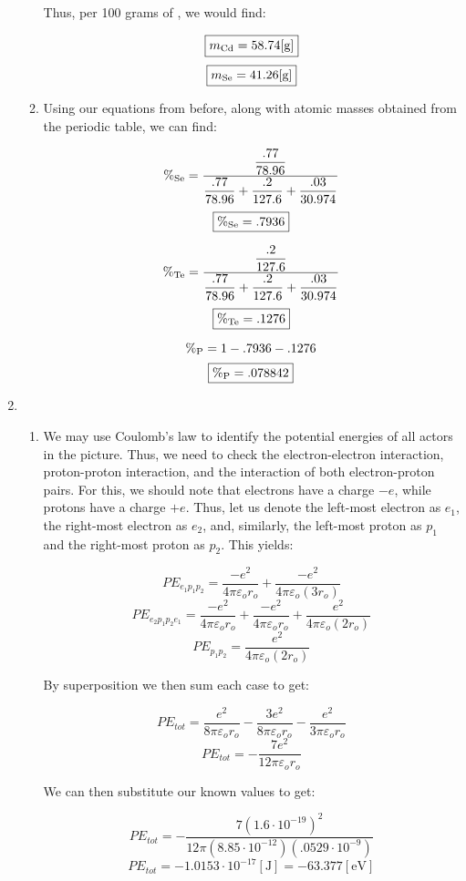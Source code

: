 \begin{enumerate}
\begin{enumerate}
        Thus, per 100 grams of , we would find:

        $$\boxed{m_{\ce{Cd}}=58.74[\si{\gram}]}$$
        $$\boxed{m_{\ce{Se}}=41.26[\si{\gram}]}$$

      \item Using our equations from before, along with atomic masses obtained from the periodic table, we can find:

        $$\%_{\ce{Se}}=\frac{\dfrac{.77}{78.96}}{\dfrac{.77}{78.96}+\dfrac{.2}{127.6}+\dfrac{.03}{30.974}}$$
        $$\boxed{\%_{\ce{Se}}=.7936}$$

        $$\%_{\ce{Te}}=\frac{\dfrac{.2}{127.6}}{\dfrac{.77}{78.96}+\dfrac{.2}{127.6}+\dfrac{.03}{30.974}}$$
        $$\boxed{\%_{\ce{Te}}=.1276}$$

        $$\%_{\ce{P}}=1-.7936-.1276$$
        $$\boxed{\%_{\ce{P}}=.078842}$$

    \end{enumerate}

  \item 

    \begin{enumerate}

      \item We may use Coulomb's law to identify the potential energies of all actors in the picture. Thus, we need to check the electron-electron interaction, proton-proton interaction, and the interaction of both electron-proton pairs. For this, we should note that electrons have a charge $-e$, while protons have a charge $+e$. Thus, let us denote the left-most electron as $e_1$, the right-most electron as $e_2$, and, similarly, the left-most proton as $p_1$ and the right-most proton as $p_2$. This yields:

        $$PE_{e_1p_1p_2}=\frac{-e^2}{4\pi\varepsilon_o r_o}+\frac{-e^2}{4\pi\varepsilon_o (3r_o)}$$
        $$PE_{e_2p_1p_2e_1}=\frac{-e^2}{4\pi\varepsilon_o r_o}+\frac{-e^2}{4\pi\varepsilon_o r_o}+\frac{e^2}{4\pi\varepsilon_o (2r_o)}$$
        $$PE_{p_1p_2}=\frac{e^2}{4\pi\varepsilon_o (2r_o)}$$

        By superposition we then sum each case to get:

        $$PE_{tot}=\frac{e^2}{8\pi\varepsilon_or_o}-\frac{3e^2}{8\pi\varepsilon_or_o}-\frac{e^2}{3\pi\varepsilon_or_o}$$
        $$PE_{tot}=-\frac{7e^2}{12\pi\varepsilon_or_o}$$

        We can then substitute our known values to get:

        $$PE_{tot}=-\frac{7\left( 1.6\cdot10^{-19} \right)^2}{12\pi\left( 8.85\cdot10^{-12} \right)\left( .0529\cdot10^{-9} \right)}$$
        $$\boxed{PE_{tot}=-1.0153\cdot10^{-17}[\si{\joule}]=-63.377[\si{\eV}]}$$


\end{enumerate}
\end{enumerate}

